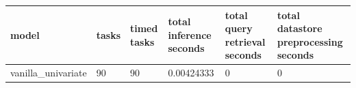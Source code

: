 \begin{tabular}{llllll}
\toprule
model & tasks & timed tasks & total inference seconds & total query retrieval seconds & total datastore preprocessing seconds \\
\midrule
vanilla\_univariate & 90 & 90 & 0.00424333 & 0 & 0 \\
\bottomrule
\end{tabular}

